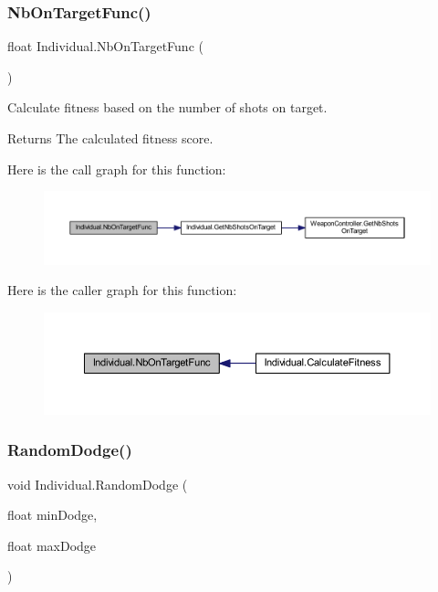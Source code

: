 \subsubsection{\texorpdfstring{Nb\+On\+Target\+Func()}{NbOnTargetFunc()}}
{\footnotesize\ttfamily float Individual.\+Nb\+On\+Target\+Func (\begin{DoxyParamCaption}{ }\end{DoxyParamCaption})}



Calculate fitness based on the number of shots on target. 

\begin{DoxyReturn}{Returns}
The calculated fitness score.
\end{DoxyReturn}
Here is the call graph for this function\+:\nopagebreak
\begin{figure}[H]
\begin{center}
\leavevmode
\includegraphics[width=350pt]{class_individual_af2d68c02add2e5e553959003e8180a9d_cgraph}
\end{center}
\end{figure}
Here is the caller graph for this function\+:\nopagebreak
\begin{figure}[H]
\begin{center}
\leavevmode
\includegraphics[width=350pt]{class_individual_af2d68c02add2e5e553959003e8180a9d_icgraph}
\end{center}
\end{figure}
\mbox{\label{class_individual_a75271d202126e53879bdb51a9fe65ef3}} 
\subsubsection{\texorpdfstring{Random\+Dodge()}{RandomDodge()}}
{\footnotesize\ttfamily void Individual.\+Random\+Dodge (\begin{DoxyParamCaption}\item[{float}]{min\+Dodge,  }\item[{float}]{max\+Dodge }\end{DoxyParamCaption})}



